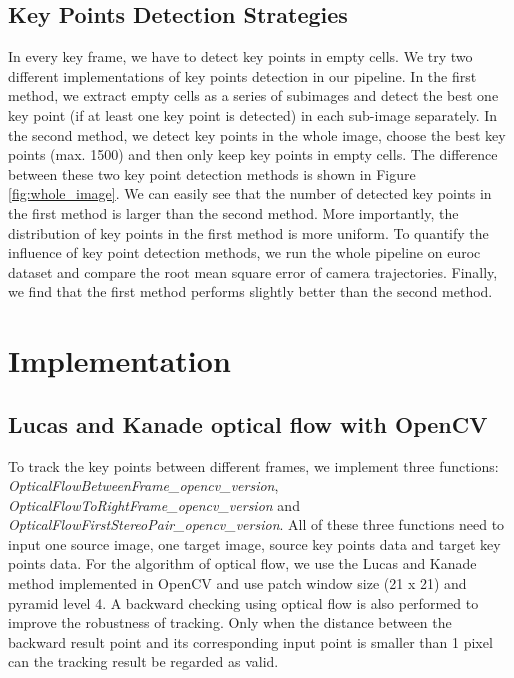 \documentclass{easychair}
\begin{document}
\subsection{Key Points Detection Strategies}
In every key frame, we have to detect key points in empty cells. We try two different implementations of key points detection in our pipeline. In the first method, we extract empty cells as a series of subimages and detect the best one key point (if at least one key point is detected) in each sub-image separately. In the second method, we detect key points in the whole image, choose the best key points (max. 1500) and then only keep key points in empty cells.  %
The difference between these two key point detection methods is shown in Figure \ref{fig:whole_image}. We can easily see that the number of detected key points in the first method is larger than the second method. More importantly, the distribution of key points in the first method is more uniform. To quantify the influence of key point detection methods, we run the whole pipeline on euroc dataset and compare the root mean square error of camera trajectories. Finally, we find that the first method performs slightly better than the second method.




\section{Implementation}
\subsection{Lucas and Kanade optical flow with OpenCV}
To track the key points between different frames, we implement three functions: \emph{OpticalFlowBetweenFrame\_opencv\_version}, \emph{OpticalFlowToRightFrame\_opencv\_version} and \emph{OpticalFlowFirstStereoPair\_opencv\_version}. All of these three functions need to input one source image, one target image, source key points data and target key points data. For the algorithm of optical flow, we use the Lucas and Kanade method implemented in OpenCV and use patch window size (21 x 21) and pyramid level 4. A backward checking using  optical flow is also performed to improve the robustness of tracking. Only when the distance between the backward result point and its corresponding input point is smaller than 1 pixel can the tracking result be regarded as valid. \\
\end{document}
